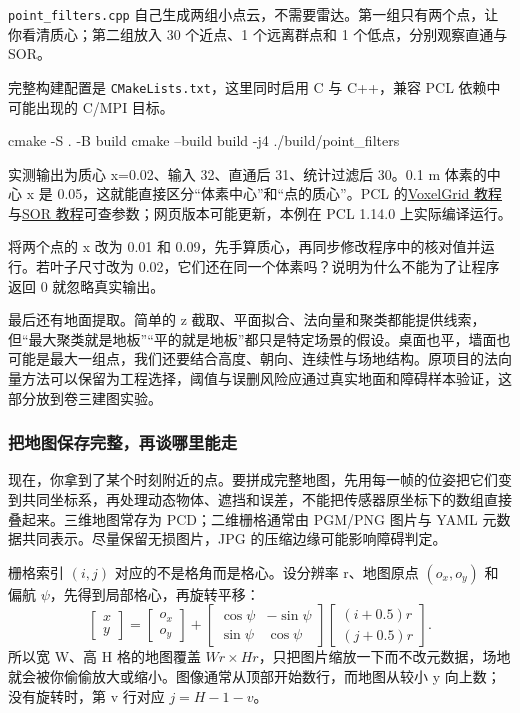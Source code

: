 \begin{example}
\texttt{point\_filters.cpp} 自己生成两组小点云，不需要雷达。第一组只有两个点，让你看清质心；第二组放入 30 个近点、1 个远离群点和 1 个低点，分别观察直通与 SOR。

完整构建配置是 \texttt{CMakeLists.txt}，这里同时启用 C 与 C++，兼容 PCL 依赖中可能出现的 C/MPI 目标。

\begin{tbash}
cmake -S . -B build
cmake --build build -j4
./build/point_filters
\end{tbash}
实测输出为质心 x=0.02、输入 32、直通后 31、统计过滤后 30。0.1 m 体素的中心 x 是 0.05，这就能直接区分“体素中心”和“点的质心”。PCL 的\href{https://pointclouds.org/documentation/tutorials/voxel_grid.html}{VoxelGrid 教程}与\href{https://pointclouds.org/documentation/tutorials/statistical_outlier.html}{SOR 教程}可查参数；网页版本可能更新，本例在 PCL 1.14.0 上实际编译运行。
\end{example}
\begin{exercise}\label{ex:nav-filter}
将两个点的 x 改为 0.01 和 0.09，先手算质心，再同步修改程序中的核对值并运行。若叶子尺寸改为 0.02，它们还在同一个体素吗？说明为什么不能为了让程序返回 0 就忽略真实输出。
\end{exercise}

最后还有地面提取。简单的 z 截取、平面拟合、法向量和聚类都能提供线索，但“最大聚类就是地板”“平的就是地板”都只是特定场景的假设。桌面也平，墙面也可能是最大一组点，我们还要结合高度、朝向、连续性与场地结构。原项目的法向量方法可以保留为工程选择，阈值与误删风险应通过真实地面和障碍样本验证，这部分放到卷三建图实验。

\subsubsection{把地图保存完整，再谈哪里能走}
现在，你拿到了某个时刻附近的点。要拼成完整地图，先用每一帧的位姿把它们变到共同坐标系，再处理动态物体、遮挡和误差，不能把传感器原坐标下的数组直接叠起来。三维地图常存为 PCD；二维栅格通常由 PGM/PNG 图片与 YAML 元数据共同表示。尽量保留无损图片，JPG 的压缩边缘可能影响障碍判定。

栅格索引 $(i,j)$ 对应的不是格角而是格心。设分辨率 r、地图原点 $(o_x,o_y)$ 和偏航 $\psi$，先得到局部格心，再旋转平移：
\[
\begin{bmatrix}x\\y\end{bmatrix}=
\begin{bmatrix}o_x\\o_y\end{bmatrix}+
\begin{bmatrix}\cos\psi&-\sin\psi\\\sin\psi&\cos\psi\end{bmatrix}
\begin{bmatrix}(i+0.5)r\\(j+0.5)r\end{bmatrix}.
\]
所以宽 W、高 H 格的地图覆盖 $Wr\times Hr$，只把图片缩放一下而不改元数据，场地就会被你偷偷放大或缩小。图像通常从顶部开始数行，而地图从较小 y 向上数；没有旋转时，第 v 行对应 $j=H-1-v$。


